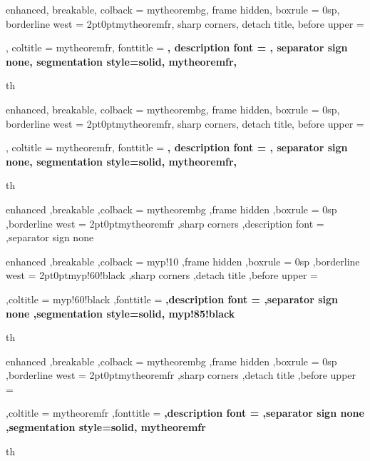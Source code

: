\renewcommand{\qed}{\ensuremath{\blacksquare}}




\setlength{\parindent}{1cm}

{%
	enhanced,
	breakable,
	colback = mytheorembg,
	frame hidden,
	boxrule = 0sp,
	borderline west = {2pt}{0pt}{mytheoremfr},
	sharp corners,
	detach title,
	before upper = \tcbtitle\par\smallskip,
	coltitle = mytheoremfr,
	fonttitle = \bfseries\sffamily,
	description font = \mdseries,
	separator sign none,
	segmentation style={solid, mytheoremfr},
}
{th}

{%
	enhanced,
	breakable,
	colback = mytheorembg,
	frame hidden,
	boxrule = 0sp,
	borderline west = {2pt}{0pt}{mytheoremfr},
	sharp corners,
	detach title,
	before upper = \tcbtitle\par\smallskip,
	coltitle = mytheoremfr,
	fonttitle = \bfseries\sffamily,
	description font = \mdseries,
	separator sign none,
	segmentation style={solid, mytheoremfr},
}
{th}


{%
	enhanced
	,breakable
	,colback = mytheorembg
	,frame hidden
	,boxrule = 0sp
	,borderline west = {2pt}{0pt}{mytheoremfr}
	,sharp corners
	,description font = \mdseries
	,separator sign none
}


{%
	enhanced
	,breakable
	,colback = myp!10
	,frame hidden
	,boxrule = 0sp
	,borderline west = {2pt}{0pt}{myp!60!black}
	,sharp corners
	,detach title
	,before upper = \tcbtitle\par\smallskip
	,coltitle = myp!60!black
	,fonttitle = \bfseries\sffamily
	,description font = \mdseries
	,separator sign none
	,segmentation style={solid, myp!85!black}
}
{th}
{%
	enhanced
	,breakable
	,colback = mytheorembg
	,frame hidden
	,boxrule = 0sp
	,borderline west = {2pt}{0pt}{mytheoremfr}
	,sharp corners
	,detach title
	,before upper = \tcbtitle\par\smallskip
	,coltitle = mytheoremfr
	,fonttitle = \bfseries\sffamily
	,description font = \mdseries
	,separator sign none
	,segmentation style={solid, mytheoremfr}
}
{th}

